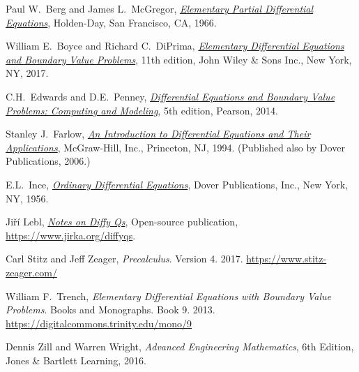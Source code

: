 \documentclass[12pt]{book}
\begin{document}
\begin{thebibliography}{MM}


\label{furtherreading:chapter}

 Paul W.\ Berg and James L.\ McGregor, 
 \emph{\href{https://books.google.com/books?id=EfJQAAAAMAAJ}{Elementary
Partial Differential Equations}}, 
 Holden-Day,
 San Francisco, CA\@,
 1966.

 William E.\ Boyce and
 Richard C.\ DiPrima,
 \emph{\href{https://books.google.com/books?id=nYWcQgAACAAJ}{Elementary
Differential Equations and Boundary Value Problems}},
 11th edition,
 John Wiley \& Sons Inc.,
 New York, NY\@, 2017.

 C.H.\ Edwards and D.E.\ Penney,
 \emph{\href{https://books.google.com/books?id=wuWvoAEACAAJ}{Differential
Equations and Boundary Value Problems: Computing and Modeling}},
 5th edition,
 Pearson,
 2014.

 Stanley J.\ Farlow,
 \emph{\href{https://books.google.com/books?id=_ozWAAAAMAAJ}{An Introduction
to Differential Equations and Their Applications}},
 McGraw-Hill, Inc.,
 Princeton, NJ\@,
 1994.  (Published also by Dover Publications, 2006.)

 E.L.\ Ince,
 \emph{\href{https://books.google.com/books?id=uYz-pqUD75gC}{Ordinary
Differential Equations}},
 Dover Publications, Inc.,
 New York, NY\@,
 1956.

Ji{\v r}\'{i} Lebl,
\href{https://www.jirka.org/diffyqs}{\emph{Notes on Diffy Qs}}, 
Open-source publication,
\url{https://www.jirka.org/diffyqs}.

Carl Stitz and Jeff Zeager,
\emph{Precalculus}. Version 4. 2017.
\url{https://www.stitz-zeager.com/}

 William F.\ Trench,
 \emph{Elementary Differential Equations with Boundary Value
Problems}. Books and Monographs. Book 9.  2013.
\url{https://digitalcommons.trinity.edu/mono/9}

Dennis Zill and Warren Wright,
\emph{Advanced Engineering Mathematics}, 6th Edition, Jones \& Bartlett Learning, 2016.

\end{thebibliography}

\printanswers


\diffyindex
\end{document}
